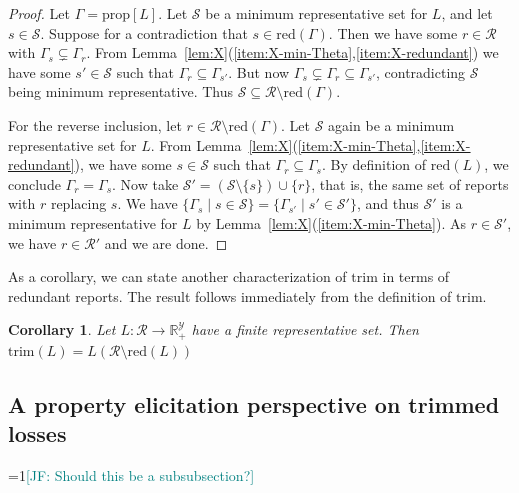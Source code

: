 \documentclass[11pt]{article}
\newcommand{\Comments}{1}
\newcommand{\mynote}[2]{\ifnum\Comments=1\textcolor{#1}{#2}\fi}
\newcommand{\jessie}[1]{\mynote{teal}{[JF: #1]}}
\newcommand{\reals}{\mathbb{R}}
\newcommand{\prop}[1]{\mathrm{prop}[#1]}
\newcommand{\R}{\mathcal{R}}
\newcommand{\Sc}{\mathcal{S}}
\newcommand{\Y}{\mathcal{Y}}
\newcommand{\trim}{\mathrm{trim}}
\newcommand{\red}{\mathrm{red}}
\newcommand{\trimcover}{\mathrm{trim}}
\newtheorem{corollary}{Corollary}
\begin{document}
\begin{proof}
  Let $\Gamma = \prop L$.
  Let $\Sc$ be a minimum representative set for $L$, and let $s\in\Sc$.
  Suppose for a contradiction that $s\in\red(\Gamma)$.
  Then we have some $r\in\R$ with $\Gamma_s \subsetneq \Gamma_r$.
  From Lemma~\ref{lem:X}(\ref{item:X-min-Theta},\ref{item:X-redundant}) we have some $s'\in\Sc$ such that $\Gamma_r \subseteq \Gamma_{s'}$.
  But now $\Gamma_s \subsetneq \Gamma_r \subseteq \Gamma_{s'}$, contradicting $\Sc$ being minimum representative.
  Thus $\Sc \subseteq \R \setminus \red(\Gamma)$.

  For the reverse inclusion, let $r\in\R\setminus\red(\Gamma)$.
  Let $\Sc$ again be a minimum representative set for $L$.
  From Lemma~\ref{lem:X}(\ref{item:X-min-Theta},\ref{item:X-redundant}), we have some $s\in\Sc$ such that $\Gamma_r \subseteq \Gamma_s$.
  By definition of $\red(L)$, we conclude $\Gamma_r = \Gamma_s$.
  Now take $\Sc' = (\Sc \setminus \{s\}) \cup \{r\}$, that is, the same set of reports with $r$ replacing $s$.
  We have $\{\Gamma_s \mid s\in\Sc\} = \{\Gamma_{s'} \mid s'\in\Sc'\}$, and thus $\Sc'$ is a minimum representative for $L$ by Lemma~\ref{lem:X}(\ref{item:X-min-Theta}).
  As $r\in\Sc'$, we have $r \in \R'$ and we are done.
\end{proof}


As a corollary, we can state another characterization of $\trim$ in terms of redundant reports.
The result follows immediately from the definition of $\trim$.

\begin{corollary}\label{cor:trim-loss-red}
  Let $L : \R \to \reals^\Y_+$ have a finite representative set.
  Then $\trimcover(L) = L(\R \setminus \red(L))$
\end{corollary}



\subsection{A property elicitation perspective on trimmed losses}
\jessie{Should this be a subsubsection?}
\end{document}
